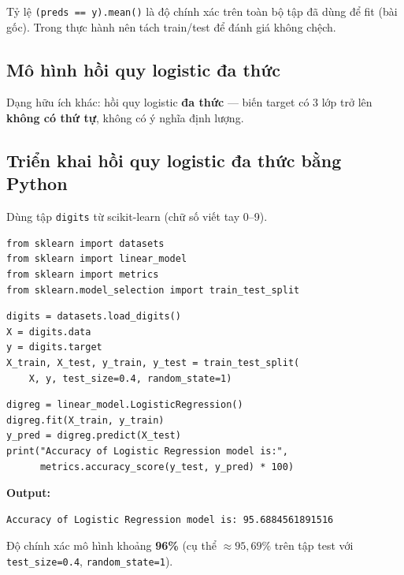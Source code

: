 \begin{ynghia}[title={Đánh giá mô hình nhị phân}]
Tỷ lệ \texttt{(preds == y).mean()} là độ chính xác trên toàn bộ tập đã dùng để fit (bài gốc).
Trong thực hành nên tách train/test để đánh giá không chệch.
\end{ynghia}

\subsection{Mô hình hồi quy logistic đa thức}

\begin{dinhnghia}[title={Multinomial logistic regression}]
Dạng hữu ích khác: hồi quy logistic \textbf{đa thức} --- biến target có 3 lớp trở lên \textbf{không có thứ tự}, không có ý nghĩa định lượng.
\end{dinhnghia}

\subsection{Triển khai hồi quy logistic đa thức bằng Python}

\begin{dongco}[title={Dataset digits}]
Dùng tập \texttt{digits} từ scikit-learn (chữ số viết tay 0--9).
\end{dongco}

\begin{vidu}[title={Import thư viện}]
\begin{lstlisting}
from sklearn import datasets
from sklearn import linear_model
from sklearn import metrics
from sklearn.model_selection import train_test_split
\end{lstlisting}
\end{vidu}

\begin{vidu}[title={Nạp digits và chia tập}]
\begin{lstlisting}
digits = datasets.load_digits()
X = digits.data
y = digits.target
X_train, X_test, y_train, y_test = train_test_split(
    X, y, test_size=0.4, random_state=1)
\end{lstlisting}
\end{vidu}

\begin{vidu}[title={Huấn luyện và đánh giá}]
\begin{lstlisting}
digreg = linear_model.LogisticRegression()
digreg.fit(X_train, y_train)
y_pred = digreg.predict(X_test)
print("Accuracy of Logistic Regression model is:",
      metrics.accuracy_score(y_test, y_pred) * 100)
\end{lstlisting}

\textbf{Output:}
\begin{verbatim}
Accuracy of Logistic Regression model is: 95.6884561891516
\end{verbatim}
\end{vidu}

\begin{ynghia}[title={Kết quả độ chính xác}]
Độ chính xác mô hình khoảng \textbf{96\%} (cụ thể $\approx 95{,}69\%$ trên tập test với \texttt{test\_size=0.4}, \texttt{random\_state=1}).
\end{ynghia}
